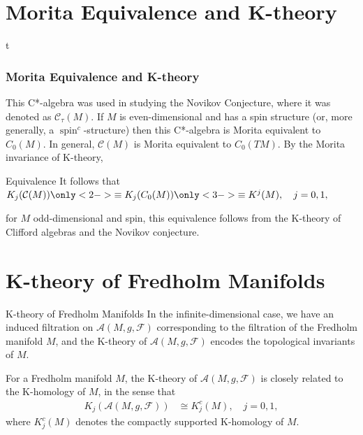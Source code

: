 \documentclass{beamer}
\begin{document}
\section{Morita Equivalence and K-theory}
\begin{frame}{t}
\frametitle{Morita Equivalence and K-theory}
    This C*-algebra was used in studying the Novikov Conjecture, where it was denoted as \(\mathcal{C}_{\tau} (M)\). If \(M\) is even-dimensional and has a spin structure (or, more generally, a \(\operatorname{spin}^{c}\)-structure) then this C*-algebra is Morita equivalent to \(C_{0}(M)\). In general, \(\mathcal{C}(M)\) is Morita equivalent to \(C_{0}(TM)\). By the Morita invariance of K-theory, 
    \begin{block}{Equivalence}
It follows that $K_{j}(\mathcal{C}(M))\only<2->{ \equiv K_{j}(C_{0}(M))}\only<3->{\equiv K^{j}(M) } , \quad j=0,1,$
\end{block}
        for \(M\) odd-dimensional and spin, this equivalence follows from the K-theory of Clifford algebras and the Novikov conjecture.
\end{frame}
\section{K-theory of Fredholm Manifolds}
\begin{frame}{K-theory of Fredholm Manifolds}
    In the infinite-dimensional case, we have an induced filtration on \(\mathcal{A}(M,g,\mathcal{F})\) corresponding to the filtration of the Fredholm manifold \(M\), and the K-theory of \(\mathcal{A}(M,g,\mathcal{F})\) encodes the topological invariants of \(M\).
        
        \vspace{0.5cm}
        
        For a Fredholm manifold \(M\), the K-theory of \(\mathcal{A}(M,g,\mathcal{F})\) is closely related to the K-homology of \(M\), in the sense that
        \begin{align*}
            K_{j}(\mathcal{A}(M,g,\mathcal{F})) &\cong K_{j}^{c}(M), \quad j=0,1,
        \end{align*}
        where \(K_{j}^{c}(M)\) denotes the compactly supported K-homology of \(M\).
\end{frame}
\end{document}
